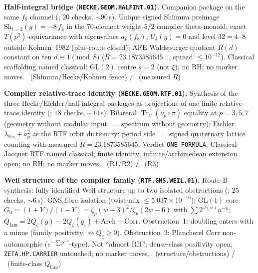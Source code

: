 \documentclass[11pt,a4paper]{article}
\theoremstyle{definition}
\begin{document}
\par\smallskip\noindent\textbf{Half-integral bridge
(\texttt{HECKE.GEOM.HALFINT.01}).}
Companion package on the same $f_8$ channel
(; $20$ checks, $\sim90$\,s). Unique signed Shimura
preimage $\mathrm{Sh}_{t=2}(g)=-8\,f_8$ in the $70$-element weight-$5/2$ compiler
theta-monoid; exact $T(p^2)$-equivariance with eigenvalues $a_p(f_8)$; $U_4(g)=0$ and
level $32=4\cdot8$ outside Kohnen~$1982$ (plus-route closed); AFE Waldspurger quotient
$R(d)$ constant on ten $d\equiv1\pmod8$ ($R=23.1873585645\ldots$, spread $\le10^{-12}$).
Classical scaffolding named classical; GL$(2)$ centre $s=2$ (not $\xi$); no RH; no marker
moves.
\mE\ (Shimura/Hecke/Kohnen fence) / \mC\ (measured $R$)

\par\smallskip\noindent\textbf{Compiler relative-trace identity
(\texttt{HECKE.GEOM.RTF.01}).}
Synthesis of the three Hecke/Eichler/half-integral packages as projections of one finite
relative-trace identity
(; $18$ checks, $\sim14$\,s). Bilateral
$\operatorname{Tr}_V(\nu_p\circ\pi)$ equality at $p=3,5,7$ (geometry without modular input
$=$ spectrum without geometry); Eichler $\lambda_{\mathrm{Eis}}+a_p^2$ as the RTF orbit
dictionary; period side $=$ signed quaternary lattice counting with measured
$R=23.1873585645$. Verdict \texttt{ONE-FORMULA}. Classical Jacquet RTF named classical;
finite identity; infinite/archimedean extension open; no RH; no marker moves.
\mE\ (R1/R2) / \mC\ (R3)

\par\smallskip\noindent\textbf{Weil structure of the compiler family
(\texttt{RTF.GNS.WEIL.01}).}
Route-B synthesis: fully identified Weil structure up to two isolated obstructions
(; $25$ checks, $\sim6$\,s).
GNS fibre isolation (twist-mix $\le5.037\times10^{-16}$);
GL$(1)$ core $G_0=(1+Y)/(1-Y)=\zeta_p(w-3)^2/\zeta_p(2w-6)$ with
$\sum 2^{\omega(n)}n^{-u}$;
$Q_{\mathrm{fam}}=2Q_\zeta(g)-2Q_\zeta(g_\flat)+\mathrm{Arch}+\mathrm{Corr}$.
Obstruction~1: doubling enters with a minus (family positivity $\not\Rightarrow Q_\zeta\ge0$).
Obstruction~2: Plancherel Corr non-automorphic ($e^{-\sum p^{-u}}$-type).
Not ``almost RH''; dense-class positivity open; \texttt{ZETA.HP.CARRIER} untouched;
no marker moves.
\mE\ (structure/obstructions) / \mC\ (finite-class $Q_{\mathrm{fam}}$)
\end{document}
